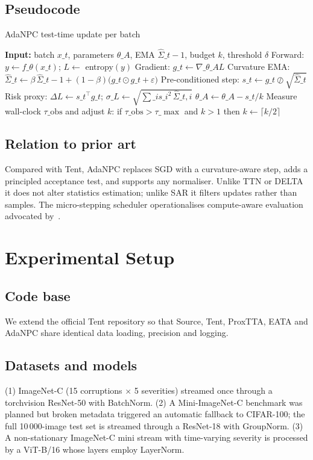 \documentclass{article} %
\begin{document}
\subsection{Pseudocode}
\begin{algorithm}[H]
\caption{AdaNPC test-time update per batch}
\begin{algorithmic}[1]
  \State{}\textbf{Input:} batch \(x\_t\), parameters \(\theta\_A\), EMA \(\hat{\Sigma}\_{t-1}\), budget \(k\), threshold \(\delta\)
  \State{}Forward: \(y \leftarrow f\_{\theta}(x\_t)\); \(L \leftarrow\) entropy\((y)\)
  \State{}Gradient: \(g\_t \leftarrow \nabla\_{\theta\_A} L\)
  \State{}Curvature EMA\@: \(\hat{\Sigma}\_t \leftarrow \beta\,\hat{\Sigma}\_{t-1} + (1-\beta)\big(g\_t \odot g\_t + \varepsilon\big)\)
  \State{}Pre-conditioned step: \(s\_t \leftarrow g\_t \oslash \sqrt{\hat{\Sigma}\_t}\)
  \State{}Risk proxy: \(\Delta L \leftarrow s\_t^{\top} g\_t\); \(\sigma\_L \leftarrow \sqrt{\sum\_i s\_i^2\,\hat{\Sigma}\_{t,i}}\)
      \State{}\(\theta\_A \leftarrow \theta\_A - s\_t/k\)
    \EndFor{}
  \EndIf{}
  \State{}Measure wall-clock \(\tau\_{\mathrm{obs}}\) and adjust \(k\): if \(\tau\_{\mathrm{obs}} > \tau\_{\max}\) and \(k>1\) then \(k \leftarrow \lceil k/2 \rceil\)
\end{algorithmic}
\end{algorithm}
\subsection{Relation to prior art}
Compared with Tent, AdaNPC replaces SGD with a curvature-aware step, adds a principled acceptance test, and supports any normaliser. Unlike TTN or DELTA it does not alter statistics estimation; unlike SAR it filters updates rather than samples. The micro-stepping scheduler operationalises compute-aware evaluation advocated by~\cite{alfarra-2023-evaluation}.

\section{Experimental Setup}\label{sec:experimental}
\subsection{Code base}
We extend the official Tent repository so that Source, Tent, ProxTTA, EATA and AdaNPC share identical data loading, precision and logging.
\subsection{Datasets and models}
(1) ImageNet-C (15 corruptions \(\times\) 5 severities) streamed once through a torchvision ResNet-50 with BatchNorm. (2) A Mini-ImageNet-C benchmark was planned but broken metadata triggered an automatic fallback to CIFAR-100; the full 10\,000-image test set is streamed through a ResNet-18 with GroupNorm. (3) A non-stationary ImageNet-C mini stream with time-varying severity is processed by a ViT-B/16 whose layers employ LayerNorm.
\end{document}
